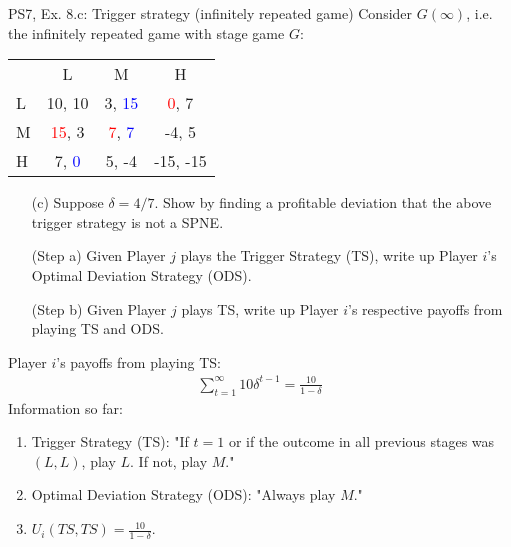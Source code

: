 \begin{frame}{PS7, Ex. 8.c: Trigger strategy (infinitely repeated game)}
    Consider $G(\infty)$, i.e. the infinitely repeated game with stage game $G$: \vspace{-6pt}
    \begin{table}
      \begin{tabular}{l|c|c|c|}
        \multicolumn{1}{c}{} & \multicolumn{1}{c}{L} & \multicolumn{1}{c}{M} & \multicolumn{1}{c}{H} \\\cline{2-4}
        L & 10, 10 & 3, \textcolor{blue}{15} & \textcolor{red}{0}, 7 \\\cline{2-4}
        M & \textcolor{red}{15}, 3 & \textcolor{red}{7}, \textcolor{blue}{7} & -4, 5 \\\cline{2-4}
        H & 7, \textcolor{blue}{0} & 5, -4 & -15, -15 \\\cline{2-4}
      \end{tabular}
    \end{table}
    \begin{itemize}
      \vspace{-4pt} \item[(c)] Suppose $\delta = 4/7$. Show by finding a profitable deviation that the above trigger strategy is not a SPNE. \vspace{-6pt}
    \end{itemize}
  \begin{multicols}{2}
    \begin{itemize}
      \item[(Step a)] Given Player $j$ plays the Trigger Strategy (TS), write up Player $i$'s Optimal Deviation Strategy (ODS).
      \item[(Step b)] Given Player $j$ plays TS, write up Player $i$'s respective payoffs from playing TS and ODS.
    \end{itemize}
    Player $i$'s payoffs from playing TS:
    \begin{align*}
      \sum_{t=1}^\infty10\delta^{t-1}=\frac{10}{1-\delta}
    \end{align*}
    \vfill\null\columnbreak
    Information so far:
    \begin{enumerate}
      \item Trigger Strategy (TS): "If $t=1$ or if the outcome in all previous stages was $(L,L)$, play $L$. If not, play $M$."
      \item Optimal Deviation Strategy (ODS): "Always play $M$."
      \item $U_i(TS,TS)=\frac{10}{1-\delta}$.
    \end{enumerate}
    \vfill\null
  \end{multicols}
\end{frame}
